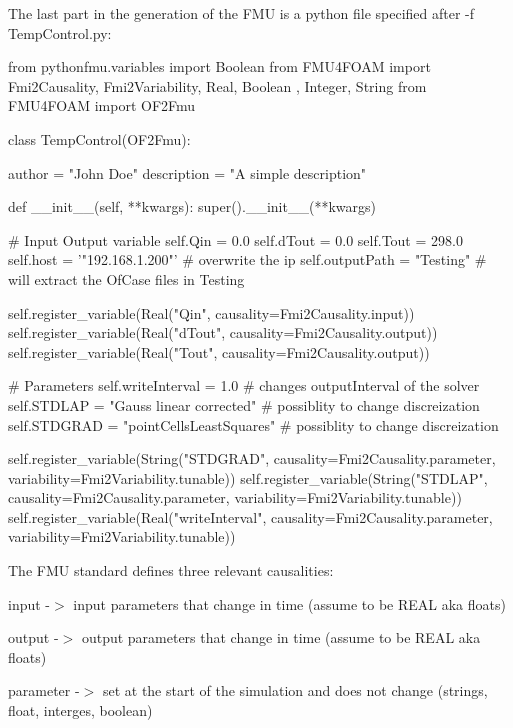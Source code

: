 The last part in the generation of the F\+MU is a python file specified after -\/f Temp\+Control.\+py\+: 
\begin{DoxyCode}
from pythonfmu.variables import Boolean
from FMU4FOAM import Fmi2Causality, Fmi2Variability, Real, Boolean , Integer, String
from FMU4FOAM import OF2Fmu


class TempControl(OF2Fmu):

    author = "John Doe"
    description = "A simple description"

    def \_\_init\_\_(self, **kwargs):
        super().\_\_init\_\_(**kwargs)

        # Input Output variable
        self.Qin = 0.0
        self.dTout = 0.0
        self.Tout = 298.0
        self.host = '"192.168.1.200"' # overwrite the ip
        self.outputPath = "Testing" # will extract the OfCase files in Testing

        self.register\_variable(Real("Qin", causality=Fmi2Causality.input))
        self.register\_variable(Real("dTout", causality=Fmi2Causality.output))
        self.register\_variable(Real("Tout", causality=Fmi2Causality.output))

        # Parameters
        self.writeInterval = 1.0 # changes outputInterval of the solver
        self.STDLAP = "Gauss linear corrected" # possiblity to change discreization
        self.STDGRAD = "pointCellsLeastSquares" # possiblity to change discreization


        self.register\_variable(String("STDGRAD", 
            causality=Fmi2Causality.parameter, variability=Fmi2Variability.tunable))
        self.register\_variable(String("STDLAP", 
            causality=Fmi2Causality.parameter, variability=Fmi2Variability.tunable))
        self.register\_variable(Real("writeInterval", 
            causality=Fmi2Causality.parameter, variability=Fmi2Variability.tunable))
\end{DoxyCode}


The F\+MU standard defines three relevant causalities\+:


\begin{DoxyItemize}
\item input -\/$>$ input parameters that change in time (assume to be R\+E\+AL aka floats)
\item output -\/$>$ output parameters that change in time (assume to be R\+E\+AL aka floats)
\item parameter -\/$>$ set at the start of the simulation and does not change (strings, float, interges, boolean)
\end{DoxyItemize}

